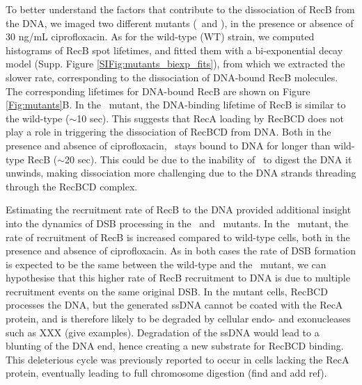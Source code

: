 To better understand the factors that contribute to the dissociation of RecB from the DNA, we imaged two different mutants (\dreca\ and \teneighty), in the presence or absence of 30 ng/mL ciprofloxacin.
As for the wild-type (WT) strain, we computed histograms of RecB spot lifetimes, and fitted them with a bi-exponential decay model (Supp. Figure \ref{SIFig:mutants_biexp_fits}), from which we extracted the slower rate, corresponding to the dissociation of DNA-bound RecB molecules. The corresponding lifetimes for DNA-bound RecB are shown on Figure \ref{Fig:mutants}B. In the \dreca\ mutant, the DNA-binding lifetime of RecB is similar to the wild-type ($\sim$10 sec). This suggests that RecA loading by RecBCD does not play a role in triggering the dissociation of RecBCD from DNA. Both in the presence and absence of ciprofloxacin, \teneighty\ stays bound to DNA for longer than wild-type RecB ($\sim$20 sec). This could be due to the inability of \teneighty\ to digest the DNA it unwinds, making dissociation more challenging due to the DNA strands threading through the RecBCD complex.

Estimating the recruitment rate of RecB to the DNA provided additional insight into the dynamics of DSB processing in the \dreca\ and \teneighty\ mutants. In the \dreca\ mutant, the rate of recruitment of RecB is increased compared to wild-type cells, both in the presence and absence of ciprofloxacin. As in both cases the rate of DSB formation is expected to be the same between the wild-type and the \dreca\ mutant, we can hypothesise that this higher rate of RecB recruitment to DNA is due to multiple recruitment events on the same original DSB. In the mutant cells, RecBCD processes the DNA, but the generated ssDNA cannot be coated with the RecA protein, and is therefore likely to be degraded by cellular endo- and exonucleases such as XXX (give examples). Degradation of the ssDNA would lead to a blunting of the DNA end, hence creating a new substrate for RecBCD binding. This deleterious cycle was previously reported to occur in cells lacking the RecA protein, eventually leading to full chromosome digestion (find and add ref).




